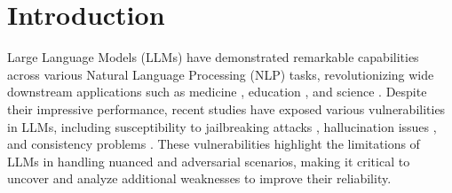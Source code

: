 \section{Introduction}










Large Language Models (LLMs) \citep{zhou2023survey} have demonstrated remarkable capabilities across various Natural Language Processing (NLP) tasks, revolutionizing wide downstream applications such as medicine \citep{zhao2023survey}, education \citep{kasneci2023chatgpt}, and science \citep{li2024quantifying, guo2023can, huang2024social}. Despite their impressive performance, recent studies have exposed various vulnerabilities in LLMs, including susceptibility to jailbreaking attacks \citep{zou2023universal}, hallucination issues \citep{xu2024hallucination}, and consistency problems \citep{liang2024internal, huang-etal-2024-1}. These vulnerabilities highlight the limitations of LLMs in handling nuanced and adversarial scenarios, making it critical to uncover and analyze additional weaknesses to improve their reliability.


